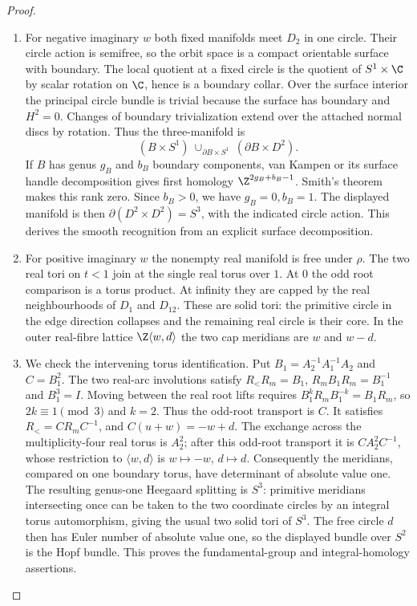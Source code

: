 \begin{proof}
\begin{enumerate}[label=\arabic*.,leftmargin=*]
\item For negative imaginary $w$ both fixed manifolds meet $D_2$ in one circle.
Their circle action is semifree, so the orbit space is a compact
orientable surface with boundary. The local quotient at a fixed circle
is the quotient of $S^1\times\C$ by scalar rotation on $\C$, hence is
a boundary collar. Over the surface interior the principal circle bundle
is trivial because the surface has boundary and $H^2=0$. Changes of
boundary trivialization extend over the attached normal discs by
rotation. Thus the three-manifold is
\[
 (B\times S^1)\ \cup_{\partial B\times S^1}\ (\partial B\times D^2).
\]
If $B$ has genus $g_B$ and $b_B$ boundary components, van Kampen or its
surface handle decomposition gives first homology
$\Z^{2g_B+b_B-1}$. Smith's theorem makes this rank zero. Since $b_B>0$,
we have $g_B=0,b_B=1$. The displayed manifold is then
$\partial(D^2\times D^2)=S^3$, with the indicated circle action. This
derives the smooth recognition from an explicit surface decomposition.

\item For positive imaginary $w$ the nonempty real manifold is free under
$\rho$. The two real tori on $t<1$ join at the single real torus over
$1$. At $0$ the odd root comparison is a torus product. At infinity
they are capped by the real neighbourhoods of $D_1$ and $D_{12}$.
These are solid tori: the primitive circle in the edge direction
collapses and the remaining real circle is their core. In the outer
real-fibre lattice $\Z\langle w,d\rangle$ the two cap meridians are
$w$ and $w-d$.

\item We check the intervening torus identification. Put
$B_1=A_2^{-1}A_1^{-1}A_2$ and $C=B_1^2$. The two real-arc involutions
satisfy $R_<R_m=B_1$, $R_mB_1R_m=B_1^{-1}$ and $B_1^3=I$.
Moving between the real root lifts requires
$B_1^kR_mB_1^{-k}=B_1R_m$, so $2k\equiv1\pmod3$ and $k=2$.
Thus the odd-root transport is $C$. It satisfies $R_<=CR_mC^{-1}$, and
$C(u+w)=-w+d$. The exchange across the multiplicity-four real torus
is $A_2^2$; after this odd-root transport it is
$CA_2^2C^{-1}$, whose restriction to $\langle w,d\rangle$ is
$w\mapsto-w$, $d\mapsto d$. Consequently the meridians, compared on
one boundary torus, have determinant of absolute value one. The
resulting genus-one Heegaard splitting is $S^3$: primitive meridians
intersecting once can be taken to the two coordinate circles by an
integral torus automorphism, giving the usual two solid tori of $S^3$.
The free circle $d$ then has Euler number of absolute value one, so
the displayed bundle over $S^2$ is the Hopf bundle. This proves the
fundamental-group and integral-homology assertions.
\end{enumerate}
\end{proof}

